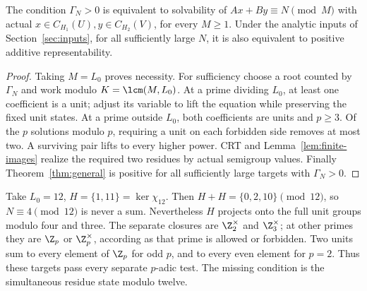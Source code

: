 \begin{theorem}\label{thm:local}
The condition \(\Gamma_N>0\) is equivalent to solvability of
\(Ax+By\equiv N\pmod M\) with actual
\(x\in C_{H_1}(U),y\in C_{H_2}(V)\), for every \(M\ge1\).
Under the analytic inputs of Section~\ref{sec:inputs}, for all
sufficiently large \(N\), it is also equivalent to positive additive
representability.
\end{theorem}
\begin{proof}
Taking \(M=L_0\) proves necessity. For sufficiency choose a root
counted by \(\Gamma_N\) and work modulo \(K=\lcm(M,L_0)\).
At a prime dividing \(L_0\), at least one coefficient is a unit;
adjust its variable to lift the equation while preserving the fixed
unit states. At a prime outside \(L_0\), both coefficients are units
and \(p\ge3\). Of the \(p\) solutions modulo \(p\), requiring a
unit on each forbidden side removes at most two. A surviving pair
lifts to every higher power. CRT and Lemma~\ref{lem:finite-images}
realize the required two residues by actual semigroup values.
Finally Theorem~\ref{thm:general} is positive for all sufficiently
large targets with \(\Gamma_N>0\).
\end{proof}

\begin{remark}\label{rem:coupled}
Take \(L_0=12\), \(H=\{1,11\}=\ker\chi_{12}\).
Then \(H+H=\{0,2,10\}\pmod{12}\), so \(N\equiv4\pmod{12}\)
is never a sum. Nevertheless \(H\) projects onto the full unit groups
modulo four and three. The separate closures are \(\Z_2^\times\)
and \(\Z_3^\times\); at other primes they are \(\Z_p\) or
\(\Z_p^\times\), according as that prime is allowed or forbidden.
Two units sum to every element of \(\Z_p\) for odd \(p\), and to
every even element for \(p=2\). Thus these targets pass every
separate \(p\)-adic test. The missing condition is the simultaneous
residue state modulo twelve.
\end{remark}
